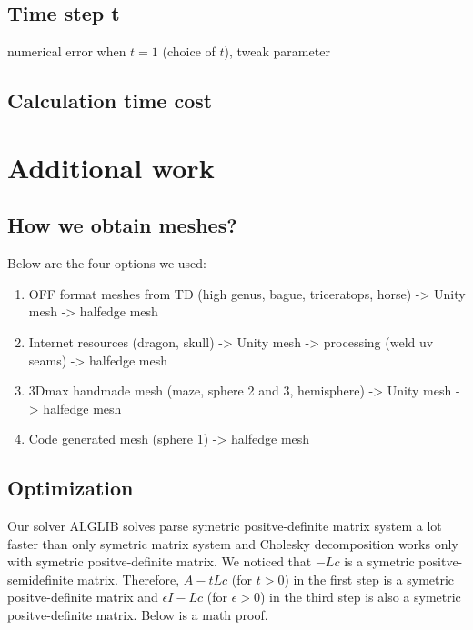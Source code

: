 \documentclass[a4paper,12pt,twoside]{article}
\begin{document}
\subsection{Time step t}

numerical error when $t = 1$ (choice of $t$), tweak parameter

\subsection{Calculation time cost}

\section{Additional work}

\subsection{How we obtain meshes?}
Below are the four options we used:

\begin{enumerate}

\item
OFF format meshes from TD (high genus, bague, triceratops, horse) -> Unity mesh -> halfedge mesh

\item
Internet resources (dragon, skull) -> Unity mesh -> processing (weld uv seams) -> halfedge mesh

\item
3Dmax handmade mesh (maze, sphere 2 and 3, hemisphere) -> Unity mesh -> halfedge mesh

\item
Code generated mesh (sphere 1) -> halfedge mesh

\end{enumerate}

\subsection{Optimization}
Our solver ALGLIB solves parse symetric positve-definite matrix system a lot faster than only symetric matrix system and Cholesky decomposition works only with symetric positve-definite matrix.
We noticed that $-Lc$ is a symetric positve-semidefinite matrix.
Therefore, $A-tLc$ (for $t>0$) in the first step is a symetric positve-definite matrix and $\epsilon I-Lc$ (for $\epsilon >0$) in the third step is also a symetric positve-definite matrix. Below is a math proof.
\end{document}
